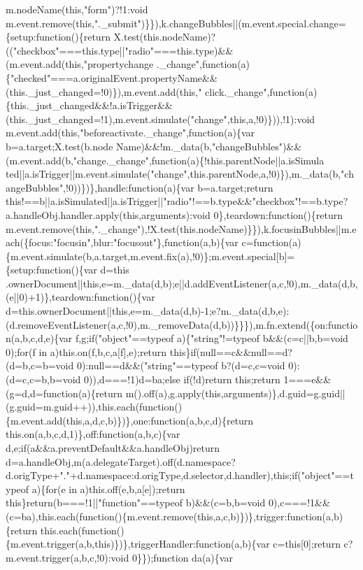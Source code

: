 \begin{DoxyCode}
{       m.nodeName(this,"form")?!1:void
       m.event.remove(this,".\_submit")\}\}),k.changeBubbles||(m.event.special.change=\{setup:function()\{return
       X.test(this.nodeName)?(("checkbox"===this.type||"radio"===this.type)&&(m.event.add(this,"propertychange
      .\_change",function(a)\{"checked"===a.originalEvent.propertyName&&(this.\_just\_changed=!0)\}),m.event.add(this,"
      click.\_change",function(a)\{this.\_just\_changed&&!a.isTrigger&&(this.\_just\_changed=!1),m.event.simulate("change",this,a,!0)\})),!1):void m.event.add(this,"beforeactivate.\_change",function(a)\{var
       b=a.target;X.test(b.node
      Name)&&!m.\_data(b,"changeBubbles")&&(m.event.add(b,"change.\_change",function(a)\{!this.parentNode||a.isSimula
      ted||a.isTrigger||m.event.simulate("change",this.parentNode,a,!0)\}),m.\_data(b,"changeBubbles",!0))\})\},handle:function(a)\{var b=a.target;return
       this!==b||a.isSimulated||a.isTrigger||"radio"!==b.type&&"checkbox"!==b.type?a.handleObj.handler.apply(this,arguments):void 0\},teardown:function()\{return
       m.event.remove(this,".\_change"),!X.test(this.nodeName)\}\}),k.focusinBubbles||m.each(\{focus:"focusin",blur:"focusout"\},function(a,b)\{var
       c=function(a)\{m.event.simulate(b,a.target,m.event.fix(a),!0)\};m.event.special[b]=\{setup:function()\{var
       d=this
      .ownerDocument||this,e=m.\_data(d,b);e||d.addEventListener(a,c,!0),m.\_data(d,b,(e||0)+1)\},teardown:function()\{var
       d=this.ownerDocument||this,e=m.\_data(d,b)-1;e?m.\_data(d,b,e):(d.removeEventListener(a,c,!0),m.\_removeData(d,b))\}\}\}),m.fn.extend(\{on:function(a,b,c,d,e)\{var f,g;if("object"==typeof a)\{"string"!=typeof
       b&&(c=c||b,b=void 0);for(f in a)this.on(f,b,c,a[f],e);return this\}if(null==c&&null==d?(d=b,c=b=void
       0):null==d&&("string"==typeof b?(d=c,c=void 0):(d=c,c=b,b=void 0)),d===!1)d=ba;else if(!d)return this;return
       1===e&&(g=d,d=function(a)\{return
       m().off(a),g.apply(this,arguments)\},d.guid=g.guid||(g.guid=m.guid++)),this.each(function()\{m.event.add(this,a,d,c,b)\})\},one:function(a,b,c,d)\{return this.on(a,b,c,d,1)\},off:function(a,b,c)\{var
       d,e;if(a&&a.preventDefault&&a.handleObj)return
       d=a.handleObj,m(a.delegateTarget).off(d.namespace?d.origType+"."+d.namespace:d.origType,d.selector,d.handler),this;if("object"==typeof a)\{for(e in a)this.off(e,b,a[e]);return
       this\}return(b===!1||"function"==typeof b)&&(c=b,b=void
       0),c===!1&&(c=ba),this.each(function()\{m.event.remove(this,a,c,b)\})\},trigger:function(a,b)\{return
       this.each(function()\{m.event.trigger(a,b,this)\})\},triggerHandler:function(a,b)\{var c=this[0];return c?m.event.trigger(a,b,c,!0):void 0\}\});function da(a)\{var
}
\end{DoxyCode}
